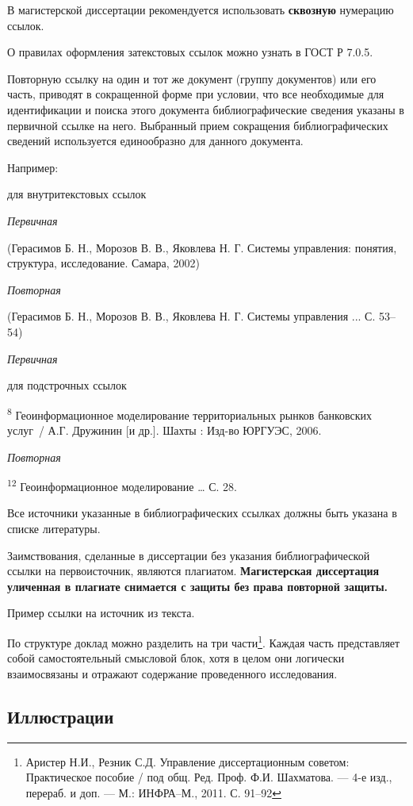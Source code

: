 \documentclass[12pt,a4paper, oneside]{extreport}
\begin{document}
В магистерской диссертации рекомендуется использовать \textbf{сквозную} нумерацию ссылок.

О правилах оформления затекстовых ссылок можно узнать в ГОСТ Р 7.0.5.

Повторную ссылку на один и тот же документ (группу документов) или его часть, приводят в сокращенной форме при условии, что все необходимые для идентификации и поиска этого документа библиографические сведения указаны в первичной ссылке на него. Выбранный прием сокращения библиографических сведений используется единообразно для данного документа.

Например:

для внутритекстовых ссылок

\noindent \textit{Первичная}

(Герасимов Б. Н., Морозов В. В., Яковлева Н. Г. Системы управления: понятия, структура, исследование. Самара, 2002)

\noindent \textit{Повторная}

(Герасимов Б. Н., Морозов В. В., Яковлева Н. Г. Системы управления ... С. 53–54)

\noindent \textit{Первичная}

для подстрочных ссылок

\textsuperscript{8} Геоинформационное моделирование территориальных рынков банковских услуг~/ А.Г. Дружинин [и др.]. Шахты : Изд-во ЮРГУЭС, 2006.

\noindent \textit{Повторная}

\textsuperscript{12} Геоинформационное моделирование … С. 28.

Все источники указанные в библиографических ссылках должны быть указана в списке литературы.

Заимствования, сделанные в диссертации без указания библиографической ссылки на первоисточник, являются плагиатом. \textbf{Магистерская диссертация уличенная в плагиате снимается с защиты без права повторной защиты.}

Пример ссылки на источник из текста.

По структуре доклад можно разделить на три части\footnote{Аристер Н.И., Резник С.Д. Управление диссертационным советом: Практическое пособие / под общ. Ред. Проф. Ф.И. Шахматова. --- 4-е изд., перераб. и доп. --- М.: ИНФРА–М., 2011. С. 91–92}. Каждая часть представляет собой самостоятельный смысловой блок, хотя в целом они логически взаимосвязаны и отражают содержание проведенного исследования.

\subsection{Иллюстрации}
\end{document}
